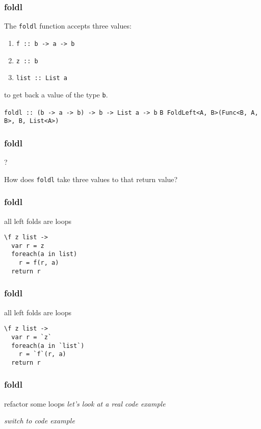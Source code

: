 \begin{frame}
\frametitle{foldl}
The \lstinline[basicstyle=\ttfamily]$foldl$ function accepts three values:
\begin{enumerate}
\item \lstinline[basicstyle=\ttfamily]$f :: b -> a -> b$
\item \lstinline[basicstyle=\ttfamily]$z :: b$
\item \lstinline[basicstyle=\ttfamily]$list :: List a$
\end{enumerate}
to get back a value of the type \lstinline[basicstyle=\ttfamily]$b$.

\hrulefill

\lstinline[basicstyle=\ttfamily]$foldl :: (b -> a -> b) -> b -> List a -> b$
\lstinline[basicstyle=\ttfamily]$B FoldLeft<A, B>(Func<B, A, B>, B, List<A>)$
\end{frame}

\begin{frame}
\frametitle{foldl}
\begin{block}{?}
\begin{center}
How does \lstinline[basicstyle=\ttfamily]$foldl$ take three values to that return value?
\end{center}
\end{block}
\end{frame}

\begin{frame}[fragile]
\frametitle{foldl}
\begin{block}{all left folds are loops}
\begin{lstlisting}[style=haskell,basicstyle=\scriptsize\ttfamily,mathescape]
\f z list ->
  var r = z
  foreach(a in list)
    r = f(r, a)
  return r
\end{lstlisting}
\end{block}
\end{frame}

\begin{frame}[fragile]
\frametitle{foldl}
\begin{block}{all left folds are loops}
\begin{lstlisting}[style=haskell,basicstyle=\scriptsize\ttfamily,mathescape]
\f z list ->
  var r = `z`
  foreach(a in `list`)
    r = `f`(r, a)
  return r
\end{lstlisting}
\end{block}
\end{frame}

\begin{frame}[fragile]
\frametitle{foldl}
\begin{block}{refactor some loops}
\emph{let's look at a real code example}
\end{block}
\tiny{\emph{switch to code example}}
\end{frame}


